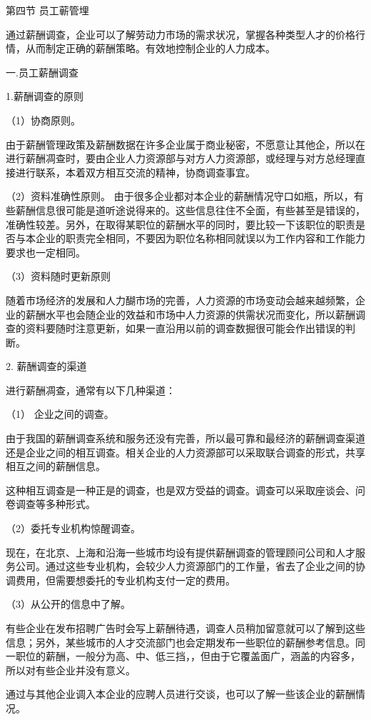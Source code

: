 第四节 员工蕲管埋

    通过薪酬调查，企业可以了解劳动力市场的需求状况，掌握各种类型人才的价格行情，从而制定正确的薪酬策略。有效地控制企业的人力成本。

一.员工薪酬调查

    1.薪酬调查的原则

    （1）协商原则。

    由于薪酬管理政策及薪酬数据在许多企业属于商业秘密，不愿意让其他企，所以在进行薪酬凋查时，要由企业人力资源部与对方人力资源部，或经理与对方总经理直接进行联系，本着双方相互交流的精神，协商调查事宜。

    （2）资料准确性原则。
    由于很多企业都对本企业的薪酬情况守口如瓶，所以，有些薪酬信息很可能是道听途说得来的。这些信息往住不全面，有些甚至是错误的，准确性较差。另外，在取得某职位的薪酬水平的同时，要比较一下该职位的职责是否与本企业的职责完全相同，不要因为职位名称相同就误以为工作内容和工作能力要求也一定相同。

    （3）资料随时更新原则

    随着市场经济的发展和人力醐市场的完善，人力资源的市场变动会越来越频繁，企业的薪酬水平也会随企业的效益和市场中人力资源的供需状况而变化，所以薪酬调查的资料要随时注意更新，如果一直沿用以前的调查数掘很可能会作出错误的判断。

    2. 薪酬调查的渠道

    进行薪酬凋查，通常有以下几种渠道：

    （1） 企业之间的调查。

    由于我国的薪酬调查系统和服务还没有完善，所以最可靠和最经济的薪酬调查渠道还是企业之间的相互调查。相关企业的人力资源部可以采取联合调查的形式，共享相互之间的薪酬信息。

    这种相互调查是一种正是的调查，也是双方受益的调查。调查可以采取座谈会、问卷调查等多种形式。

    （2）委托专业机构惊醒调查。

    现在，在北京、上海和沿海一些城市均设有提供薪酬调查的管理顾问公司和人才服务公司。通过这些专业机构，会较少人力资源部门的工作量，省去了企业之间的协调费用，但需要想委托的专业机构支付一定的费用。

    （3）从公开的信息中了解。

    有些企业在发布招聘广告时会写上薪酬待遇，调查人员稍加留意就可以了解到这些信息；另外，某些城市的人才交流部门也会定期发布一些职位的薪酬参考信息。同一职位的薪酬，一般分为高、中、低三挡，，但由于它覆盖面广，涵盖的内容多，所以对有些企业并没有意义。

    通过与其他企业调入本企业的应聘人员进行交谈，也可以了解一些该企业的薪酬情况。

